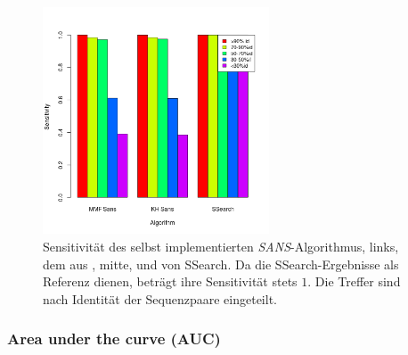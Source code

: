 \documentclass{article}
\begin{document}
\begin{figure}[h]
  \begin{center}
    \includegraphics[width=0.6\textwidth]{img/barplot_beide.png}
    \caption{Sensitivität des selbst implementierten \emph{SANS}-Algorithmus, links, dem aus \cite{Holm}, mitte, und von SSearch. 
      Da die SSearch-Ergebnisse als Referenz dienen, beträgt ihre Sensitivität stets $1$.
      Die Treffer sind nach Identität der Sequenzpaare eingeteilt.}
    \label{barplot}
  \end{center}
\end{figure}

\subsubsection{Area under the curve (AUC)}
\end{document}

